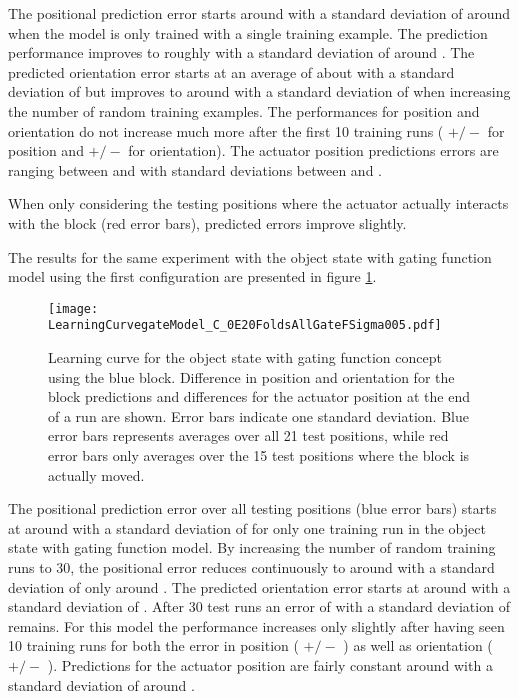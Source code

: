 The positional prediction error starts around  with a standard deviation of around  when the model is only trained with a single training example. The prediction performance improves to roughly  with a standard deviation of around .
The predicted orientation error starts at an average of about  with a standard deviation of  but improves to around  with a standard deviation of  when increasing the number of random training examples.
The performances for position and orientation do not increase much more after the first 10 training runs ( $+/-$  for position and  $+/-$  for orientation).
The actuator position predictions errors are ranging between  and  with standard deviations between  and .

When only considering the testing positions where the actuator actually interacts with the block (red error bars), predicted errors improve slightly.

The results for the same experiment with the object state with gating function model using the first configuration are presented in figure \ref{fig:learnCurveGate1}.

\begin{figure}[h]
\centering
\texttt{[image: LearningCurvegateModel\_C\_0E20FoldsAllGateFSigma005.pdf]}
\caption{Learning curve for the object state with gating function concept using the blue block. Difference in position and orientation for the block predictions and differences for the actuator position at the end of a run are shown. Error bars indicate one standard deviation. Blue error bars represents averages over all 21 test positions, while red error bars only averages over the 15 test positions where the block is actually moved.}
\label{fig:learnCurveGate1}
\end{figure}

The positional prediction error over all testing positions (blue error bars) starts at around  with a standard deviation of  for only one training run in the object state with gating function model. By increasing the number of random training runs to 30, the positional error reduces continuously to around  with a standard deviation of only around .
The predicted orientation error starts at around  with a standard deviation of .
After 30 test runs an error of  with a standard deviation of  remains.
For this model the performance increases only slightly after having seen 10 training runs for both the error in position ( $+/-$ ) as well as orientation ( $+/-$ ).
Predictions for the actuator position are fairly constant around  with a standard deviation of around .

